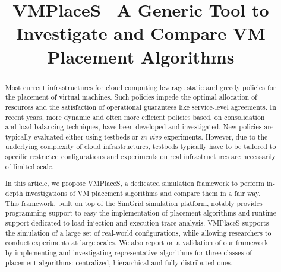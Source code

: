 \documentclass[conference]{IEEEtran}
\newcommand{\sg}{SimGrid\xspace}
\newcommand{\vmps}{VMPlaceS\xspace}
\begin{document}
%
\title{\vmps -- A Generic Tool to Investigate and Compare VM Placement Algorithms}


\author{
}



\maketitle

\thispagestyle{plain}
\pagestyle{plain}

\begin{abstract} %
    Most current infrastructures for cloud computing leverage static
    and greedy policies for the placement of virtual machines. Such
    policies impede the optimal allocation of resources and the
    satisfaction of operational guarantees like service-level
    agreements. In recent years, more dynamic and often more efficient
    policies based, \eg on consolidation and load balancing
    techniques, have been developed and investigated. New policies are
    typically evaluated either using testbeds or \emph{in-vivo}
    experiments. However, due to the underlying complexity of cloud
    infrastructures, testbeds typically have to be tailored to
    specific restricted configurations and experiments on real
    infrastructures are necessarily of limited scale.

    In this article, we propose \vmps, a dedicated simulation
    framework to perform in-depth investigations of VM placement
    algorithms and compare them in a fair way. This framework, built
    on top of the \sg simulation platform, notably provides
    programming support to easy the implementation of placement
    algorithms and runtime support dedicated to load injection and
    execution trace analysis. \vmps supports the simulation of a large
    set of real-world configurations, while allowing researchers to
    conduct experiments at large scales. We also report on a
    validation of our framework by implementing and investigating
    representative algorithms for three classes of placement
    algorithms: centralized, hierarchical and fully-distributed ones.
\end{abstract}
\end{document}
